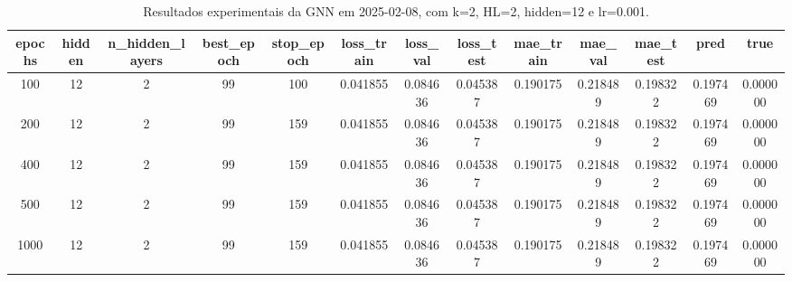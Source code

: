 \begin{table}[h]
\centering
\caption{Resultados experimentais da GNN em 2025-02-08, com k=2, HL=2, hidden=12 e lr=0.001.}
\label{tab:gnn_results_k2_hl2_h12_d20250208}
\begin{tabular}{ccccccccccccc}
\toprule
epochs & hidden & n\_hidden\_layers & best\_epoch & stop\_epoch & loss\_train & loss\_val & loss\_test & mae\_train & mae\_val & mae\_test & pred & true \\
\midrule
100 & 12 & 2 & 99 & 100 & 0.041855 & 0.084636 & 0.045387 & 0.190175 & 0.218489 & 0.198322 & 0.197469 & 0.000000 \\
200 & 12 & 2 & 99 & 159 & 0.041855 & 0.084636 & 0.045387 & 0.190175 & 0.218489 & 0.198322 & 0.197469 & 0.000000 \\
400 & 12 & 2 & 99 & 159 & 0.041855 & 0.084636 & 0.045387 & 0.190175 & 0.218489 & 0.198322 & 0.197469 & 0.000000 \\
500 & 12 & 2 & 99 & 159 & 0.041855 & 0.084636 & 0.045387 & 0.190175 & 0.218489 & 0.198322 & 0.197469 & 0.000000 \\
1000 & 12 & 2 & 99 & 159 & 0.041855 & 0.084636 & 0.045387 & 0.190175 & 0.218489 & 0.198322 & 0.197469 & 0.000000 \\
\bottomrule
\end{tabular}
\end{table}
